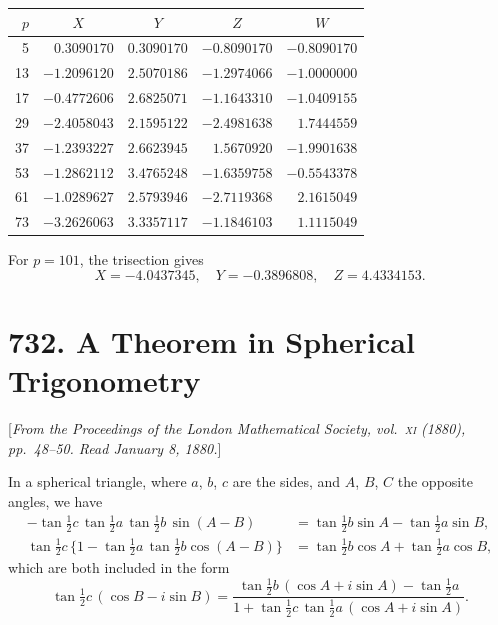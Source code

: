 \documentclass[12pt,a4paper]{article}
\theoremstyle{plain}
\begin{document}
\begin{center}
\begin{tabular}{r|rrrr}
\toprule
$p$ & \multicolumn{1}{c}{$X$} & \multicolumn{1}{c}{$Y$} & \multicolumn{1}{c}{$Z$} & \multicolumn{1}{c}{$W$} \\
\midrule
5  & $0.3090170$ & $0.3090170$ & $-0.8090170$ & $-0.8090170$ \\
13 & $-1.2096120$ & $2.5070186$ & $-1.2974066$ & $-1.0000000$ \\
17 & $-0.4772606$ & $2.6825071$ & $-1.1643310$ & $-1.0409155$ \\
29 & $-2.4058043$ & $2.1595122$ & $-2.4981638$ & $1.7444559$ \\
37 & $-1.2393227$ & $2.6623945$ & $1.5670920$ & $-1.9901638$ \\
53 & $-1.2862112$ & $3.4765248$ & $-1.6359758$ & $-0.5543378$ \\
61 & $-1.0289627$ & $2.5793946$ & $-2.7119368$ & $2.1615049$ \\
73 & $-3.2626063$ & $3.3357117$ & $-1.1846103$ & $1.1115049$ \\
\bottomrule
\end{tabular}
\end{center}

For $p=101$, the trisection gives
\[
X=-4.0437345,\quad Y=-0.3896808,\quad Z=4.4334153.
\]

\newpage
\section*{732. A Theorem in Spherical Trigonometry}

[\textit{From the Proceedings of the London Mathematical Society, vol.~\textsc{xi} (1880), pp.~48--50.
Read January 8, 1880.}]

In a spherical triangle, where $a$, $b$, $c$ are the sides, and $A$, $B$, $C$
the opposite angles, we have
\begin{align*}
-\tan\tfrac{1}{2}c\,\tan\tfrac{1}{2}a\,\tan\tfrac{1}{2}b\,\sin(A-B)
&= \tan\tfrac{1}{2}b\sin A - \tan\tfrac{1}{2}a\sin B,\\
\tan\tfrac{1}{2}c\,\{1-\tan\tfrac{1}{2}a\,\tan\tfrac{1}{2}b\cos(A-B)\}
&= \tan\tfrac{1}{2}b\cos A + \tan\tfrac{1}{2}a\cos B,
\end{align*}
which are both included in the form
\[
\tan\tfrac{1}{2}c\,(\cos B - i\sin B)
= \frac{\tan\tfrac{1}{2}b\,(\cos A + i\sin A) - \tan\tfrac{1}{2}a}
{1 + \tan\tfrac{1}{2}c\,\tan\tfrac{1}{2}a\,(\cos A + i\sin A)}.
\]
\end{document}
